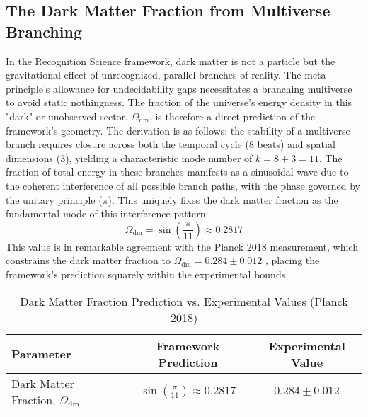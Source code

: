 \documentclass[11pt,a4paper]{article}
\begin{document}
\subsection{The Dark Matter Fraction from Multiverse Branching}
In the Recognition Science framework, dark matter is not a particle but the gravitational effect of unrecognized, parallel branches of reality. The meta-principle's allowance for undecidability gaps necessitates a branching multiverse to avoid static nothingness. The fraction of the universe's energy density in this "dark" or unobserved sector, \(\Omega_{\text{dm}}\), is therefore a direct prediction of the framework's geometry. The derivation is as follows: the stability of a multiverse branch requires closure across both the temporal cycle (8 beats) and spatial dimensions (3), yielding a characteristic mode number of \(k=8+3=11\). The fraction of total energy in these branches manifests as a sinusoidal wave due to the coherent interference of all possible branch paths, with the phase governed by the unitary principle (\(\pi\)). This uniquely fixes the dark matter fraction as the fundamental mode of this interference pattern:
\begin{equation}
\Omega_{\text{dm}} = \sin\left(\frac{\pi}{11}\right) \approx 0.2817
\end{equation}
This value is in remarkable agreement with the Planck 2018 measurement, which constrains the dark matter fraction to \(\Omega_{\text{dm}} = 0.284 \pm 0.012\) \citep{Planck2018}, placing the framework's prediction squarely within the experimental bounds.

\begin{table}[h!]
\centering
\caption{Dark Matter Fraction Prediction vs. Experimental Values (Planck 2018)}
\label{tab:dm_fraction}
\begin{tabular}{lcc}
\toprule
\textbf{Parameter} & \textbf{Framework Prediction} & \textbf{Experimental Value} \\
\midrule
Dark Matter Fraction, \(\Omega_{\text{dm}}\) & \(\sin\left(\frac{\pi}{11}\right) \approx 0.2817\) & \(0.284 \pm 0.012\) \\
\bottomrule
\end{tabular}
\end{table}
\end{document}

